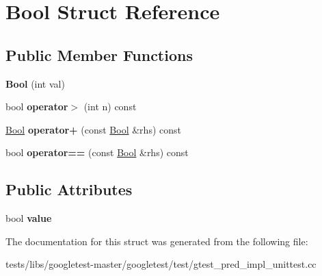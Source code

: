 \hypertarget{structBool}{}\section{Bool Struct Reference}
\label{structBool}
\subsection*{Public Member Functions}
\begin{DoxyCompactItemize}
\item 
\mbox{\label{structBool_a03dfd4851b13abb29414887fcada7fca}} 
{\bfseries Bool} (int val)
\item 
\mbox{\label{structBool_a7baecbc58992eb06157fbbbaa560be0b}} 
bool {\bfseries operator$>$} (int n) const
\item 
\mbox{\label{structBool_a6f4ecdec19082e896cffce66e6b6e7cc}} 
\hyperlink{structBool}{Bool} {\bfseries operator+} (const \hyperlink{structBool}{Bool} \&rhs) const
\item 
\mbox{\label{structBool_afe799a4977c5ebe4c215d5d4ebd77adb}} 
bool {\bfseries operator==} (const \hyperlink{structBool}{Bool} \&rhs) const
\end{DoxyCompactItemize}
\subsection*{Public Attributes}
\begin{DoxyCompactItemize}
\item 
\mbox{\label{structBool_a16be863c269f988cdcbe59f9d846a141}} 
bool {\bfseries value}
\end{DoxyCompactItemize}


The documentation for this struct was generated from the following file\+:\begin{DoxyCompactItemize}
\item 
tests/libs/googletest-\/master/googletest/test/gtest\+\_\+pred\+\_\+impl\+\_\+unittest.\+cc\end{DoxyCompactItemize}
